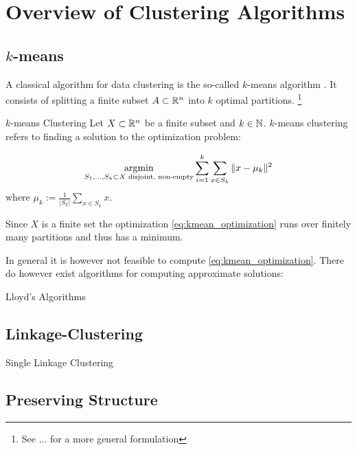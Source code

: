\chapter{Overview of Clustering Algorithms}
\cite{Jain1988-en}

\section{$k$-means}
A classical algorithm for data clustering is the so-called $k$-means algorithm \cite[chapter~\todo]{Scitovski2021}. It consists of splitting a finite subset $A \subset \mathbb R^n$ into $k$ optimal partitions. \footnote{See ... \cite{Scitovski2021} for a more general formulation}

\begin{definition}{$k$-means Clustering}{}
Let $X \subset \mathbb R^n$ be a finite subset and $k \in \mathbb N$. $k$-means clustering refers to finding a solution to the optimization problem:

\begin{equation}
\label{eq:kmean_optimization}
\operatorname*{argmin}_{S_1, \dots, S_k \subset X \text{ disjoint, non-empty}} \sum_{i = 1}^k \sum_{x \in S_k} \|x - \mu_k\|^2
\end{equation}
where $\mu_k := \frac{1}{|S_k|}\sum_{x \in S_k} x$.
\end{definition}

Since $X$ is a finite set the optimization \ref{eq:kmean_optimization} runs over finitely many partitions and thus has a minimum.

In general it is however not feasible to compute \ref{eq:kmean_optimization}\cite{Dasgupta2008}. There do however exist algorithms for computing approximate solutions:

\begin{definition}{Lloyd's Algorithms}{}
\end{definition}

\section{Linkage-Clustering}

\begin{definition}{Single Linkage Clustering}{}
\end{definition}

\section{Preserving Structure}

